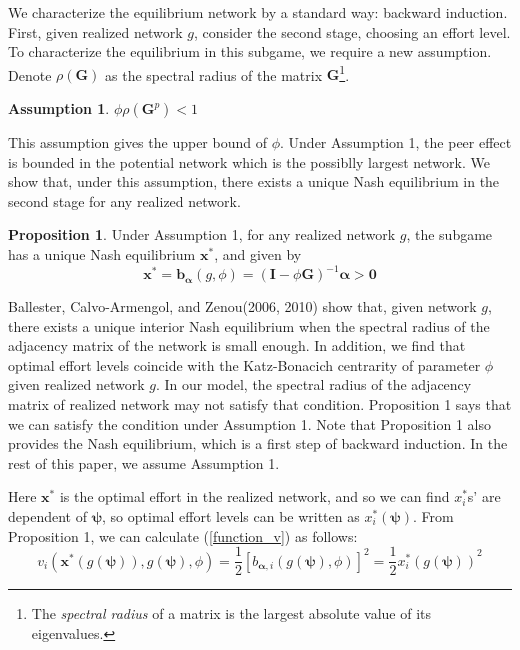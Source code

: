 \documentclass[12pt]{article}
\theoremstyle{definition}
\newtheorem{proposition}{Proposition}
\newtheorem{assumption}{Assumption}
\newcommand{\bm}[1]{\boldsymbol{#1}}
\begin{document}
We characterize the equilibrium network by a standard way: backward induction.
First, given realized network $g$, consider the second stage, choosing an effort level.
To characterize the equilibrium in this subgame, we require a new assumption.
Denote $\rho (\bm{G})$ as the spectral radius of the matrix $\bm{G}$\footnote{The {\it{spectral radius}} of a matrix is the largest absolute value of its eigenvalues.}.

\begin{assumption}
$\phi \rho(\bm{G}^p) < 1$
\end{assumption}

This assumption gives the upper bound of $\phi$.
Under Assumption 1, the peer effect is bounded in the potential network which is the possiblly largest network.
We show that, under this assumption, there exists a unique Nash equilibrium in the second stage for any realized network.

\begin{proposition}
Under Assumption 1, for any realized network $g$, the subgame has a unique Nash equilibrium $\bm{x}^*$, and given by
\[ \bm{x}^* = \bm{b}_{\bm{\alpha}}(g, \phi) = {(\bm{I} - \phi \bm{G})}^{-1} \bm{\alpha} > \bm{0} \]
\end{proposition}

Ballester, Calvo-Armengol, and Zenou(2006, 2010) show that, given network $g$, there exists a unique interior Nash equilibrium when the spectral radius of the adjacency matrix of the network is small enough.
In addition, we find that optimal effort levels coincide with the Katz-Bonacich centrarity of parameter $\phi$ given realized network $g$.
In our model, the spectral radius of the adjacency matrix of realized network may not satisfy that condition.
Proposition 1 says that we can satisfy the condition under Assumption 1.
Note that Proposition 1 also provides the Nash equilibrium, which is a first step of backward induction.
In the rest of this paper, we assume Assumption 1.

Here $\bm{x}^*$ is the optimal effort in the realized network, and so we can find $x_i^*$s' are dependent of $\bm{\psi}$, so optimal effort levels can be written as $x_i^*(\bm{\psi})$.
From Proposition 1, we can calculate (\ref{function_v}) as follows:
\begin{equation}
	\label{opteff}
	v_i(\bm{x}^*(g(\bm{\psi})), g(\bm{\psi}), \phi) = \frac{1}{2} {[b_{\bm{\alpha}, i}(g(\bm{\psi}), \phi)]}^2 = \frac{1}{2} {x_i^*(g(\bm{\psi}))}^2
\end{equation}
\end{document}
